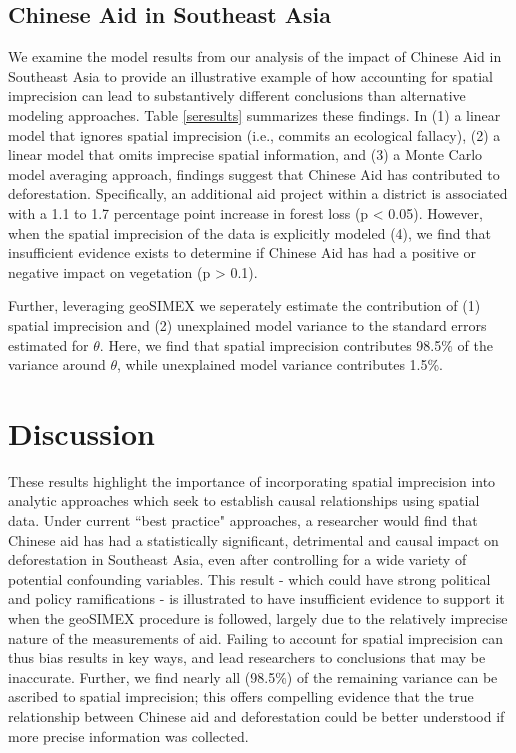 \subsection{Chinese Aid in Southeast Asia}
We examine the model results from our analysis of the impact of Chinese Aid in Southeast Asia to provide an illustrative example of how accounting for spatial imprecision can lead to substantively different conclusions than alternative modeling approaches.
Table \ref{seresults} summarizes these findings.
In (1) a linear model that ignores spatial imprecision (i.e., commits an ecological fallacy), (2) a linear model that omits imprecise spatial information, and (3) a Monte Carlo model averaging approach, findings suggest that Chinese Aid has contributed to deforestation. Specifically, an additional aid project within a district is associated with a 1.1 to 1.7 percentage point increase in forest loss (p < 0.05).
However, when the spatial imprecision of the data is explicitly modeled (4), we find that insufficient evidence exists to determine if Chinese Aid has had a positive or negative impact on vegetation (p > 0.1).
\par
Further, leveraging geoSIMEX we seperately estimate the contribution of (1) spatial imprecision and (2) unexplained model variance to the standard errors estimated for $\theta$.
Here, we find that spatial imprecision contributes 98.5\% of the variance around $\theta$, while unexplained model variance contributes 1.5\%.

\newpage

\section{Discussion}
These results highlight the importance of incorporating spatial imprecision into analytic approaches which seek to establish causal relationships using spatial data.
Under current ``best practice" approaches, a researcher would find that Chinese aid has had a statistically significant, detrimental and causal impact on deforestation in Southeast Asia, even after controlling for a wide variety of potential confounding variables.
This result - which could have strong political and policy ramifications - is illustrated to have insufficient evidence to support it when the geoSIMEX procedure is followed, largely due to the relatively imprecise nature of the measurements of aid.
Failing to account for spatial imprecision can thus bias results in key ways, and lead researchers to conclusions that may be inaccurate.
Further, we find nearly all (98.5\%) of the remaining variance can be ascribed to spatial imprecision; this offers compelling evidence that the true relationship between Chinese aid and deforestation could be better understood if more precise information was collected.
